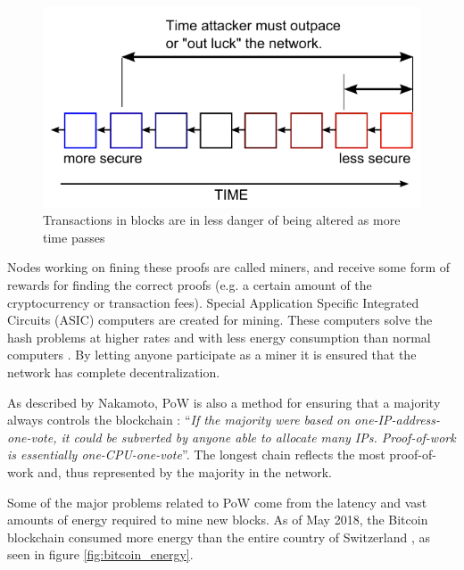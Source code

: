 \begin{figure}[ht]
    \centering
    \includegraphics[width=1\textwidth]{Images/bitcoin_security}
    \caption{Transactions in blocks are in less danger of being altered as more time passes \cite{Driscoll}}
    \label{fig:bitcoin_security}
\end{figure}

Nodes working on fining these proofs are called miners, and receive some form of rewards for finding the correct proofs (e.g. a certain amount of the cryptocurrency or transaction fees). Special Application Specific Integrated Circuits (ASIC) computers are created for mining. These computers solve the hash problems at higher rates and with less energy consumption than normal computers \cite{mining}. By letting anyone participate as a miner it is ensured that the network has complete decentralization.

As described by Nakamoto, PoW is also a method for ensuring that a majority always controls the blockchain \cite{Nakamoto_bitcoin}: \enquote{\textit{If the majority were based on one-IP-address-one-vote, it could be subverted by anyone able to allocate many IPs. Proof-of-work is essentially one-CPU-one-vote}}.  The longest chain reflects the most proof-of-work and, thus represented by the majority in the network.

Some of the major problems related to PoW come from the latency and vast amounts of energy required to mine new blocks. As of May 2018, the Bitcoin blockchain consumed more energy than the entire country of Switzerland \cite{bitcoin_energy}, as seen in figure \ref{fig:bitcoin_energy}. 

